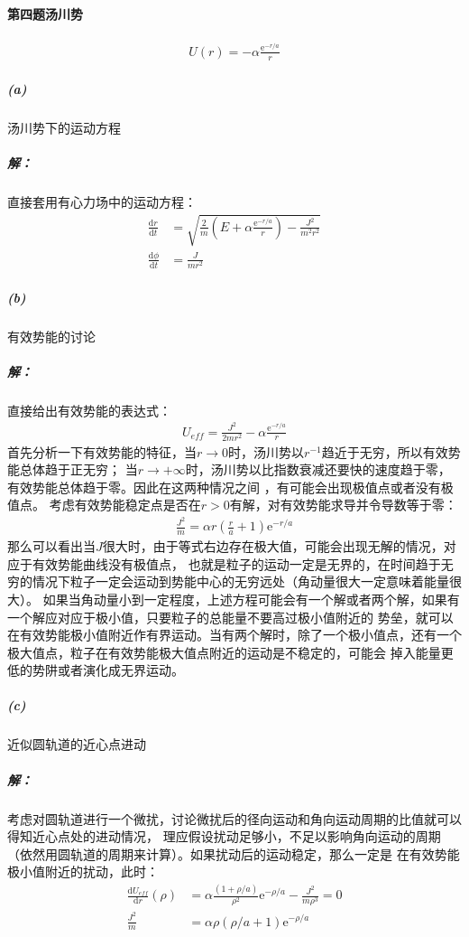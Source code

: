 \documentclass[a4paper]{ctexart}
\def\d{\mathrm{d}}
\def\e{\mathrm{e}}
\begin{document}
    \paragraph{第四题\;\;汤川势}
    \begin{align}
        U(r) = -\alpha\frac{\mathrm{e}^{-r/a}}{r}
    \end{align}
    \subparagraph{(a)}汤川势下的运动方程
    \subparagraph{解：}直接套用有心力场中的运动方程：
    \begin{align}
        \frac{\d r}{\d t} &= \sqrt{\frac{2}{m}\left(E + \alpha\frac{\e ^{-r/a}}{r}\right)-\frac{J^{2}}{m^{2}r^{2}}}\\
        \frac{\d \phi}{\d t} &= \frac{J}{mr^{2}}
    \end{align}
    \subparagraph{(b)}有效势能的讨论
    \subparagraph{解：}
    直接给出有效势能的表达式：
    \begin{align}
        U_{eff} = \frac{J^{2}}{2mr^{2}} - \alpha\frac{\mathrm{e}^{-r/a}}{r}
    \end{align}
    首先分析一下有效势能的特征，当$r\to 0$时，汤川势以$r^{-1}$趋近于无穷，所以有效势能总体趋于正无穷；
    当$r\to+\infty$时，汤川势以比指数衰减还要快的速度趋于零，有效势能总体趋于零。因此在这两种情况之间
    ，有可能会出现极值点或者没有极值点。
    考虑有效势能稳定点是否在$r>0$有解，对有效势能求导并令导数等于零：
    \begin{align}
        \frac{J^{2}}{m} = \alpha r(\frac{r}{a} + 1)\e ^{-r/a}
    \end{align}
    那么可以看出当$J$很大时，由于等式右边存在极大值，可能会出现无解的情况，对应于有效势能曲线没有极值点，
    也就是粒子的运动一定是无界的，在时间趋于无穷的情况下粒子一定会运动到势能中心的无穷远处（角动量很大一定意味着能量很大）。
    如果当角动量小到一定程度，上述方程可能会有一个解或者两个解，如果有一个解应对应于极小值，只要粒子的总能量不要高过极小值附近的
    势垒，就可以在有效势能极小值附近作有界运动。当有两个解时，除了一个极小值点，还有一个极大值点，粒子在有效势能极大值点附近的运动是不稳定的，可能会
    掉入能量更低的势阱或者演化成无界运动。
    \subparagraph{(c)}近似圆轨道的近心点进动
    \subparagraph{解：}
    考虑对圆轨道进行一个微扰，讨论微扰后的径向运动和角向运动周期的比值就可以得知近心点处的进动情况，
    理应假设扰动足够小，不足以影响角向运动的周期（依然用圆轨道的周期来计算）。如果扰动后的运动稳定，那么一定是
    在有效势能极小值附近的扰动，此时：
    \begin{align}
        \frac{\d U_{eff}}{\d r}(\rho) &= \alpha\frac{(1 + \rho/a)}{\rho^{2}}\e ^{-\rho/a} - \frac{J^{2}}{m\rho^{3}} = 0\\
        \frac{J^{2}}{m} &=  \alpha \rho(\rho/a + 1)\e ^{-\rho/a}
    \end{align}
\end{document}
